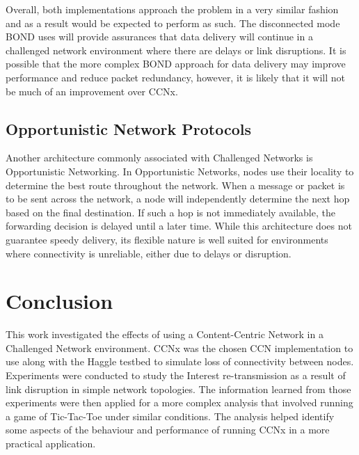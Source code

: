 \documentclass[a4paper,12pt]{report}      %
\begin{document}
Overall, both implementations approach the problem in a very similar fashion and as a result
would be expected to perform as such. The disconnected mode BOND uses will provide assurances
that data delivery will continue in a challenged network environment where there are delays or link
disruptions. It is possible that the more complex BOND approach for data delivery may improve
performance and reduce packet redundancy, however, it is likely that it will not be much of an
improvement over CCNx.

\section{Opportunistic Network Protocols}

Another architecture commonly associated with Challenged Networks is Opportunistic Networking. In
Opportunistic Networks, nodes use their locality to determine the best route throughout the network.
When a message or packet is to be sent across the network, a node will independently determine the
next hop based on the final destination. If such a hop is not immediately available, the forwarding
decision is delayed until a later time. While this architecture does not guarantee speedy delivery, its
flexible nature is well suited for environments where connectivity is unreliable, either due to delays or
disruption\cite{oppnets}.

\pagebreak
\chapter{Conclusion}

This work investigated the effects of using a Content-Centric Network in a Challenged Network environment. CCNx was the chosen
CCN implementation to use along with the Haggle testbed to simulate loss of connectivity between nodes. Experiments were
conducted to study the Interest re-transmission as a result of link disruption in simple network topologies. The
information learned from those experiments were then applied for a more complex analysis that involved running a
game of Tic-Tac-Toe under similar conditions. The analysis helped identify some aspects of the behaviour and performance of
running CCNx in a more practical application.
\end{document}
